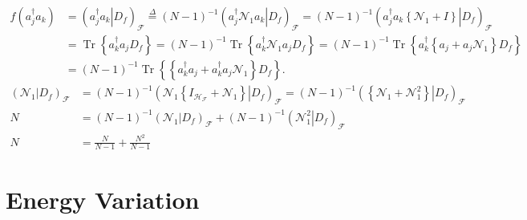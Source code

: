 \documentclass[aps,preprint]{revtex4}%
\begin{document}
\begin{align}
f\left(  a_{j}^{\dagger}a_{k}\right)   &  =\left(  \left.  a_{j}^{\dagger
}a_{k}\right\vert D_{f}\right)  _{\mathcal{F}}\overset{\Delta}{=}\left(
N-1\right)  ^{-1}\left(  \left.  a_{j}^{\dagger}\mathcal{N}_{1}a_{k}%
\right\vert D_{f}\right)  _{\mathcal{F}}=\left(  N-1\right)  ^{-1}\left(
\left.  a_{j}^{\dagger}a_{k}\left\{  \mathcal{N}_{1}+I\right\}  \right\vert
D_{f}\right)  _{\mathcal{F}}\\
&  =\operatorname*{Tr}\left\{  a_{k}^{\dagger}a_{j}D_{f}\right\}  =\left(
N-1\right)  ^{-1}\operatorname*{Tr}\left\{  a_{k}^{\dagger}\mathcal{N}%
_{1}a_{j}D_{f}\right\}  =\left(  N-1\right)  ^{-1}\operatorname*{Tr}\left\{
a_{k}^{\dagger}\left\{  a_{j}+a_{j}\mathcal{N}_{1}\right\}  D_{f}\right\} \\
&  =\left(  N-1\right)  ^{-1}\operatorname*{Tr}\left\{  \left\{
a_{k}^{\dagger}a_{j}+a_{k}^{\dagger}a_{j}\mathcal{N}_{1}\right\}
D_{f}\right\}  .
\end{align}%
\begin{align}
\left(  \left.  \mathcal{N}_{1}\right\vert D_{f}\right)  _{\mathcal{F}}  &
=\left(  N-1\right)  ^{-1}\left(  \left.  \mathcal{N}_{1}\left\{
I_{\mathcal{H}_{\mathcal{F}}}+\mathcal{N}_{1}\right\}  \right\vert
D_{f}\right)  _{\mathcal{F}}=\left(  N-1\right)  ^{-1}\left(  \left.  \left\{
\mathcal{N}_{1}+\mathcal{N}_{1}^{2}\right\}  \right\vert D_{f}\right)
_{\mathcal{F}}\\
N  &  =\left(  N-1\right)  ^{-1}\left(  \left.  \mathcal{N}_{1}\right\vert
D_{f}\right)  _{\mathcal{F}}+\left(  N-1\right)  ^{-1}\left(  \left.
\mathcal{N}_{1}^{2}\right\vert D_{f}\right)  _{\mathcal{F}}\\
N  &  =\frac{N}{N-1}+\frac{N^{2}}{N-1}%
\end{align}


\section{Energy Variation}%
\end{document}

